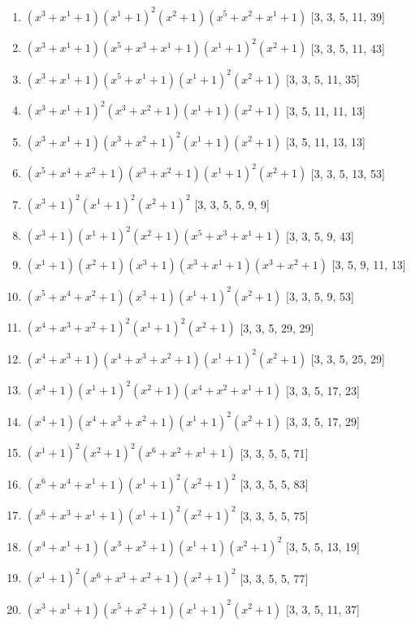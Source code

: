 \documentclass[10pt,twocolumn]{article}
\begin{document}
\begin{enumerate}
\item $(x^{3} + x^{1} + 1)(x^{1} + 1)^{2}(x^{2} + 1)(x^{5} + x^{2} + x^{1} + 1)$  [3, 3, 5, 11, 39]
\item $(x^{3} + x^{1} + 1)(x^{5} + x^{3} + x^{1} + 1)(x^{1} + 1)^{2}(x^{2} + 1)$  [3, 3, 5, 11, 43]
\item $(x^{3} + x^{1} + 1)(x^{5} + x^{1} + 1)(x^{1} + 1)^{2}(x^{2} + 1)$  [3, 3, 5, 11, 35]
\item $(x^{3} + x^{1} + 1)^{2}(x^{3} + x^{2} + 1)(x^{1} + 1)(x^{2} + 1)$  [3, 5, 11, 11, 13]
\item $(x^{3} + x^{1} + 1)(x^{3} + x^{2} + 1)^{2}(x^{1} + 1)(x^{2} + 1)$  [3, 5, 11, 13, 13]
\item $(x^{5} + x^{4} + x^{2} + 1)(x^{3} + x^{2} + 1)(x^{1} + 1)^{2}(x^{2} + 1)$  [3, 3, 5, 13, 53]
\item $(x^{3} + 1)^{2}(x^{1} + 1)^{2}(x^{2} + 1)^{2}$  [3, 3, 5, 5, 9, 9]
\item $(x^{3} + 1)(x^{1} + 1)^{2}(x^{2} + 1)(x^{5} + x^{3} + x^{1} + 1)$  [3, 3, 5, 9, 43]
\item $(x^{1} + 1)(x^{2} + 1)(x^{3} + 1)(x^{3} + x^{1} + 1)(x^{3} + x^{2} + 1)$  [3, 5, 9, 11, 13]
\item $(x^{5} + x^{4} + x^{2} + 1)(x^{3} + 1)(x^{1} + 1)^{2}(x^{2} + 1)$  [3, 3, 5, 9, 53]
\item $(x^{4} + x^{3} + x^{2} + 1)^{2}(x^{1} + 1)^{2}(x^{2} + 1)$  [3, 3, 5, 29, 29]
\item $(x^{4} + x^{3} + 1)(x^{4} + x^{3} + x^{2} + 1)(x^{1} + 1)^{2}(x^{2} + 1)$  [3, 3, 5, 25, 29]
\item $(x^{4} + 1)(x^{1} + 1)^{2}(x^{2} + 1)(x^{4} + x^{2} + x^{1} + 1)$  [3, 3, 5, 17, 23]
\item $(x^{4} + 1)(x^{4} + x^{3} + x^{2} + 1)(x^{1} + 1)^{2}(x^{2} + 1)$  [3, 3, 5, 17, 29]
\item $(x^{1} + 1)^{2}(x^{2} + 1)^{2}(x^{6} + x^{2} + x^{1} + 1)$  [3, 3, 5, 5, 71]
\item $(x^{6} + x^{4} + x^{1} + 1)(x^{1} + 1)^{2}(x^{2} + 1)^{2}$  [3, 3, 5, 5, 83]
\item $(x^{6} + x^{3} + x^{1} + 1)(x^{1} + 1)^{2}(x^{2} + 1)^{2}$  [3, 3, 5, 5, 75]
\item $(x^{4} + x^{1} + 1)(x^{3} + x^{2} + 1)(x^{1} + 1)(x^{2} + 1)^{2}$  [3, 5, 5, 13, 19]
\item $(x^{1} + 1)^{2}(x^{6} + x^{3} + x^{2} + 1)(x^{2} + 1)^{2}$  [3, 3, 5, 5, 77]
\item $(x^{3} + x^{1} + 1)(x^{5} + x^{2} + 1)(x^{1} + 1)^{2}(x^{2} + 1)$  [3, 3, 5, 11, 37]

\end{enumerate}
\end{document}
